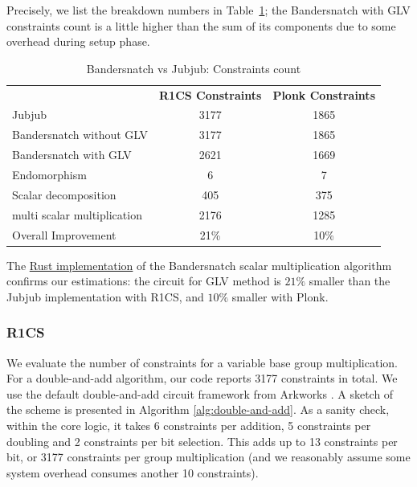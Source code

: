 \documentclass[smallextended]{svjour3}
\begin{document}
Precisely, we list the breakdown numbers in Table~\ref{tab:r1cs_full};
the  Bandersnatch with GLV constraints count is a little higher than
the sum of its components due to some overhead during setup phase.


\begin{table}[!ht]
  \centering%
  \begin{tabularx}{\textwidth}{lcc}
    & \textbf{R1CS Constraints}     & \textbf{Plonk Constraints}\\
    Jubjub& 3177 & 1865\\
    Bandersnatch without GLV& 3177 & 1865\\

    Bandersnatch with GLV&  2621&1669\\
    \quad Endomorphism & 6 & 7 \\
    \quad Scalar decomposition &  405 & 375\\
    \quad multi scalar multiplication & 2176& 1285 \\
    Overall Improvement & 21\%  & 10\% \\
  \end{tabularx}
  \caption{Bandersnatch vs Jubjub: Constraints count}
  \label{tab:r1cs_full}
\end{table}


The \href{https://github.com/zhenfeizhang/bandersnatch}{Rust implementation} of the Bandersnatch scalar multiplication
algorithm confirms our estimations: the circuit for GLV method is $21\%$ smaller
than the Jubjub implementation with R1CS, and $10\%$ smaller with Plonk.

\subsubsection{R1CS}
We evaluate the number of constraints for a 
variable base group multiplication. For a double-and-add
algorithm, 
our code reports 3177 constraints in 
total.
We use the default double-and-add circuit framework from Arkworks \cite{arkworks}.
A sketch of the scheme is presented in Algorithm \ref{alg:double-and-add}.
As a sanity check, within the core logic,
it takes 6 constraints per addition, 5 constraints
per doubling and 2 constraints per bit selection. This adds
up to 13 constraints per bit, or 3177 constraints per
group multiplication (and we reasonably assume some system overhead
consumes another 10 constraints). 
\end{document}
